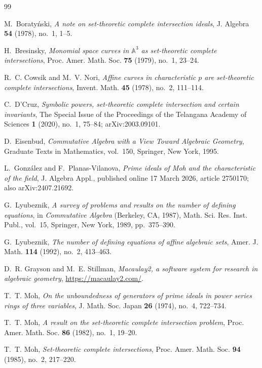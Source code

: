 \documentclass[11pt]{amsart}
\theoremstyle{remark}
\begin{document}
\clearpage
\begin{thebibliography}{99}

M.~Boraty\'nski,
\emph{A note on set-theoretic complete intersection ideals},
J. Algebra \textbf{54} (1978), no.~1, 1--5.

H.~Bresinsky,
\emph{Monomial space curves in $\mathbb A^3$ as set-theoretic complete intersections},
Proc. Amer. Math. Soc. \textbf{75} (1979), no.~1, 23--24.

R.~C. Cowsik and M.~V. Nori,
\emph{Affine curves in characteristic $p$ are set-theoretic complete intersections},
Invent. Math. \textbf{45} (1978), no.~2, 111--114.

C.~D'Cruz,
\emph{Symbolic powers, set-theoretic complete intersection and certain invariants},
The Special Issue of the Proceedings of the Telangana Academy of Sciences \textbf{1} (2020), no.~1, 75--84; arXiv:2003.09101.

D.~Eisenbud,
\emph{Commutative Algebra with a View Toward Algebraic Geometry},
Graduate Texts in Mathematics, vol.~150, Springer, New York, 1995.

L.~Gonz\'alez and F.~Planas-Vilanova,
\emph{Prime ideals of Moh and the characteristic of the field},
J. Algebra Appl., published online 17 March 2026, article 2750170; also arXiv:2407.21692.

G.~Lyubeznik,
\emph{A survey of problems and results on the number of defining equations},
in \emph{Commutative Algebra} (Berkeley, CA, 1987), Math. Sci. Res. Inst. Publ., vol.~15, Springer, New York, 1989, pp.~375--390.

G.~Lyubeznik,
\emph{The number of defining equations of affine algebraic sets},
Amer. J. Math. \textbf{114} (1992), no.~2, 413--463.

D.~R. Grayson and M.~E. Stillman,
\emph{Macaulay2, a software system for research in algebraic geometry},
\url{https://macaulay2.com/}.

T.~T. Moh,
\emph{On the unboundedness of generators of prime ideals in power series rings of three variables},
J. Math. Soc. Japan \textbf{26} (1974), no.~4, 722--734.

T.~T. Moh,
\emph{A result on the set-theoretic complete intersection problem},
Proc. Amer. Math. Soc. \textbf{86} (1982), no.~1, 19--20.

T.~T. Moh,
\emph{Set-theoretic complete intersections},
Proc. Amer. Math. Soc. \textbf{94} (1985), no.~2, 217--220.

\end{thebibliography}
\end{document}
